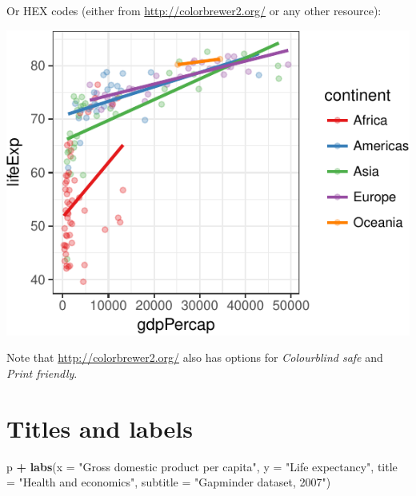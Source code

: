 \documentclass[12pt,]{krantz}
\makeatletter
\newenvironment{Shaded}{\begin{snugshade}}{\end{snugshade}}
\newcommand{\DataTypeTok}[1]{\textcolor[rgb]{0.13,0.29,0.53}{#1}}
\newcommand{\KeywordTok}[1]{\textcolor[rgb]{0.13,0.29,0.53}{\textbf{#1}}}
\newcommand{\NormalTok}[1]{#1}
\newcommand{\OperatorTok}[1]{\textcolor[rgb]{0.81,0.36,0.00}{\textbf{#1}}}
\newcommand{\StringTok}[1]{\textcolor[rgb]{0.31,0.60,0.02}{#1}}
\newenvironment{kframe}{%
\medskip{}
\setlength{\fboxsep}{.8em}
 \def\at@end@of@kframe{}%
 \ifinner\ifhmode%
  \def\at@end@of@kframe{\end{minipage}}%
  \begin{minipage}{\columnwidth}%
 \fi\fi%
 \def\FrameCommand##1{\hskip\@totalleftmargin \hskip-\fboxsep
 \colorbox{shadecolor}{##1}\hskip-\fboxsep
     \hskip-\linewidth \hskip-\@totalleftmargin \hskip\columnwidth}%
 \MakeFramed {\advance\hsize-\width
   \@totalleftmargin\z@ \linewidth\hsize
   \@setminipage}}%
 {\par\unskip\endMakeFramed%
 \at@end@of@kframe}
\renewenvironment{Shaded}{\begin{kframe}}{\end{kframe}}
\theoremstyle{definition}
\theoremstyle{definition}
\theoremstyle{definition}
\theoremstyle{remark}
\makeatother
\begin{document}
Or HEX codes (either from \url{http://colorbrewer2.org/} or any other
resource):

\begin{Shaded}
\end{Shaded}

\includegraphics{05_fine_tuning_plots_files/figure-latex/unnamed-chunk-13-1.pdf}

Note that \url{http://colorbrewer2.org/} also has options for
\emph{Colourblind safe} and \emph{Print friendly}.

\newpage

\hypertarget{titles-and-labels}{%
\section{Titles and labels}\label{titles-and-labels}}

\begin{Shaded}
\begin{Highlighting}[]
\NormalTok{p }\OperatorTok{+}
\StringTok{  }\KeywordTok{labs}\NormalTok{(}\DataTypeTok{x =} \StringTok{"Gross domestic product per capita"}\NormalTok{,}
         \DataTypeTok{y =} \StringTok{"Life expectancy"}\NormalTok{,}
         \DataTypeTok{title =} \StringTok{"Health and economics"}\NormalTok{,}
         \DataTypeTok{subtitle =} \StringTok{"Gapminder dataset, 2007"}\NormalTok{)}
\end{Highlighting}
\end{Shaded}
\end{document}
